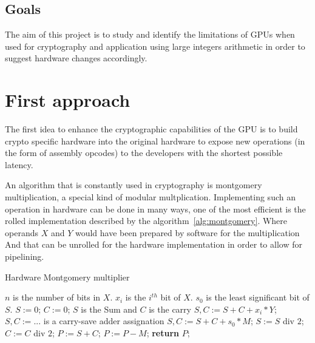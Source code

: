 \documentclass{report}
\begin{document}
\section{Goals}
    The aim of this project is to study and identify the limitations of GPUs
    when used for cryptography and application using large integers arithmetic in order to suggest
    hardware changes accordingly.

\chapter{First approach}
    The first idea to enhance the cryptographic capabilities of the GPU is to
    build crypto specific hardware into the original hardware to expose new 
    operations (in the form of assembly opcodes) to the developers with the 
    shortest possible latency. 
    
    An algorithm that is constantly used in cryptography is montgomery multiplication,
    a special kind of modular multplication. Implementing such an operation in hardware can
    be done in many ways, one of the most efficient is the rolled implementation described
    by the algorithm~\ref{alg:montgomery}. Where operands $X$ and $Y$ would have been prepared
    by software for the multiplication And that can be unrolled for the hardware implementation
    in order to allow for pipelining.
    
    \begin{algorithm}
    \caption{Hardware Montgomery multiplier~\cite{montgomeryHard}}\label{alg:montgomery}
    \begin{algorithmic}[1]
        \Statex $n$ is the number of bits in $X$.
        \Statex $x_i$ is the $i^{th}$ bit of $X$.
        \Statex $s_0$ is the least significant bit of $S$. 		
        \State $S := 0$; $C := 0$; \Comment $S$ is the Sum and $C$ is the carry
            \State $S,C := S + C + x_i * Y$; \Comment $S,C := ...$ is a carry-save adder assignation
            \State $S,C := S + C + s_0 * M$;
            \State $S := S$ div $2$; $C := C$ div $2$;  
        \EndFor
        \State $P := S + C$;
            \State $P := P - M$;
        \EndIf
        \State \textbf{return} $P$;
    \end{algorithmic}
    \end{algorithm}
    
\end{document}
